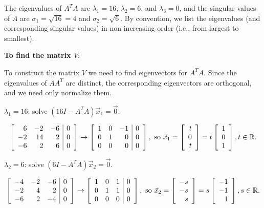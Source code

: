 \documentclass{ximera}
\begin{document}
\begin{example}
\begin{explanation}
The eigenvalues of $A^TA$ are $\lambda_1=16$, $\lambda_2=6$, and
$\lambda_3=0$, and the singular values of $A$ are $\sigma_1=\sqrt{16}=4$ and
$\sigma_2=\sqrt{6}$.
By convention, we list the eigenvalues (and corresponding singular values)
in non increasing order (i.e., from largest to smallest).
 
\textbf{To find the matrix $V$}:
 
To construct the matrix $V$ we need to find eigenvectors for $A^TA$.
Since the eigenvalues of $AA^T$ are distinct, the corresponding
eigenvectors are orthogonal, and we need only normalize them.
 
$\lambda_1=16$: solve $(16I-A^TA)\vec{x}_1= \vec{0}$.
 
\[ \left[\begin{array}{rrr|r}
6 & -2 & -6 & 0 \\ -2 & 14 & 2 & 0 \\ -6 & 2 & 6 & 0
\end{array}\right]
\rightarrow
\left[\begin{array}{rrr|r}
1 & 0 & -1 & 0 \\ 0 & 1 & 0 & 0 \\ 0 & 0 & 0 & 0
\end{array}\right],
\mbox{ so }
\vec{x}_1 =\left[\begin{array}{r} t \\ 0 \\ t \end{array}\right]
=t\left[\begin{array}{r} 1 \\ 0 \\ 1 \end{array}\right],
t\in \mathbb{R}. \]
 
$\lambda_2=6$: solve $(6I-A^TA)\vec{x}_2= \vec{0}$.
 
\[ \left[\begin{array}{rrr|r}
-4 & -2 & -6 & 0 \\ -2 & 4 & 2 & 0 \\ -6 & 2 & -4 & 0
\end{array}\right]
\rightarrow
\left[\begin{array}{rrr|r}
1 & 0 & 1 & 0 \\ 0 & 1 & 1 & 0 \\ 0 & 0 & 0 & 0
\end{array}\right],
\mbox{ so }
\vec{x}_2=\left[\begin{array}{r} -s \\ -s \\ s \end{array}\right]
=s\left[\begin{array}{r} -1 \\ -1 \\ 1 \end{array}\right],
s\in \mathbb{R}. \]
 

\end{explanation}
\end{example}
\end{document}
